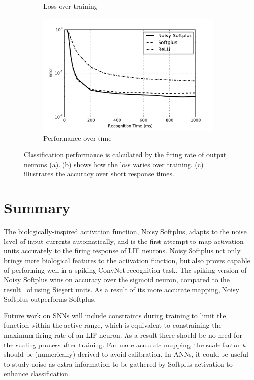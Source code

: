 \begin{figure}[bt!]
\begin{subfigure}[t]{0.4\textwidth}
		    \caption{Loss over training}
		    \label{Fig:loss}
		\end{subfigure}
		\begin{subfigure}[t]{0.4\textwidth}
			\includegraphics[width=\textwidth]{pics_iconip/9.pdf}
		    \caption{Performance over time}
		    \label{Fig:response}
		\end{subfigure}

		\caption{
			Classification performance is calculated by the firing rate of output neurons (a).
			(b) shows how the loss varies over training.
			(c) illustrates the accuracy over short response times.}
		\label{fig:training}	
	\end{figure}
\section{Summary}
	The biologically-inspired activation function, Noisy Softplus, adapts to the noise level of input currents automatically, and is the first attempt to map activation units accurately to the firing response of LIF neurons.
	Noisy Softplus not only brings more biological features to the activation function, but also proves capable of performing well in a spiking ConvNet recognition task.
	The spiking version of Noisy Softplus wins on accuracy over the sigmoid neuron, compared to the result~\cite{Stromatias2015scalable} of using Siegert units.
	As a result of its more accurate mapping, Noisy Softplus outperforms Softplus.
	
	Future work on SNNs will include constraints during training to limit the function within the active range, which is equivalent to constraining the maximum firing rate of an LIF neuron.
	As a result there should be no need for the scaling process after training.
	For more accurate mapping, the scale factor $k$ should be (numerically) derived to avoid calibration.
	In ANNs, it could be useful to study noise as extra information to be gathered by Softplus activation to enhance classification.